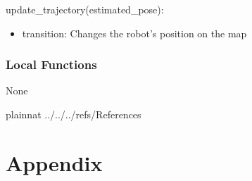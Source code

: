 \documentclass[12pt, titlepage]{article}
\begin{document}
\noindent update\_trajectory(estimated\_pose):
\begin{itemize}
\item transition: Changes the robot's position on the map
\end{itemize}


\subsubsection{Local Functions}
None

\newpage


 {plainnat}
 {../../../refs/References}

\newpage

\section{Appendix} \label{Appendix}

\end{document}
